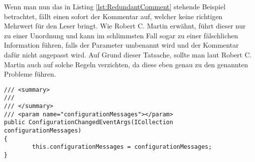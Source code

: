 \SuperPar Wenn man nun das in Listing \ref{lst:RedundantComment} stehende Beispiel betrachtet, fällt einen sofort der Kommentar auf, welcher keine richtigen Mehrwert
für den Leser bringt. Wie Robert C. Martin erwähnt, führt dieser nur zu einer Unordnung und kann im schlimmsten Fall sogar zu einer fälschlichen Information führen,
falls der Parameter umbenannt wird und der Kommentar dafür nicht angepasst wird. Auf Grund dieser Tatsache, sollte man laut Robert C. Martin auch auf solche Regeln verzichten, da diese eben genau zu den genannten Probleme führen.

\begin{lstlisting}[language={[Sharp]C}, caption=Beispiele für überflüssige Kommentare, label=lst:RedundantComment]
/// <summary>
/// 
/// </summary>
/// <param name="configurationMessages"></param>
public ConfigurationChangedEventArgs(ICollection configurationMessages)
{
		this.configurationMessages = configurationMessages;
}
\end{lstlisting}
